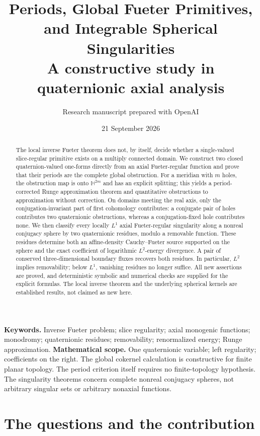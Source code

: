 \documentclass[11pt,a4paper]{article}
\title{\vspace{-12mm}\textbf{Periods, Global Fueter Primitives,\\and Integrable Spherical Singularities}\\[6pt]
\large A constructive study in quaternionic axial analysis}
\author{Research manuscript prepared with OpenAI}
\date{21 September 2026}
\numberwithin{equation}{section}
\theoremstyle{definition}
\theoremstyle{remark}
\newcommand{\HH}{\mathbb H}
\begin{document}
\maketitle
\thispagestyle{empty}
\begin{abstract}
The local inverse Fueter theorem does not, by itself, decide whether a
single-valued slice-regular primitive exists on a multiply connected domain.
We construct two closed quaternion-valued one-forms directly from an axial
Fueter-regular function and prove that their periods are the complete global
obstruction. For a meridian with $m$ holes, the obstruction map is onto
$\HH^{2m}$ and has an explicit splitting; this yields a period-corrected Runge
approximation theorem and quantitative obstructions to approximation without
correction. On domains meeting the real axis, only the conjugation-invariant
part of first cohomology contributes: a conjugate pair of holes contributes
two quaternionic obstructions, whereas a conjugation-fixed hole contributes
none. We then classify every locally $L^1$ axial Fueter-regular singularity
along a nonreal conjugacy sphere by two quaternionic residues, modulo a
removable function. These residues determine both an affine-density
Cauchy--Fueter source supported on the sphere and the exact coefficient of
logarithmic $L^2$-energy divergence. A pair of conserved three-dimensional
boundary fluxes recovers both residues. In particular, $L^2$ implies removability;
below $L^1$, vanishing residues no longer suffice. All new assertions are
proved, and deterministic symbolic and numerical checks are supplied for the
explicit formulas. The local inverse theorem and the underlying spherical
kernels are established results, not claimed as new here.
\end{abstract}
\medskip
\noindent\textbf{Keywords.} Inverse Fueter problem; slice regularity;
axial monogenic functions; monodromy; quaternionic residues; removability;
renormalized energy; Runge approximation.
\medskip
\noindent\textbf{Mathematical scope.} One quaternionic variable; left regularity;
coefficients on the right. The global cokernel calculation is constructive for
finite planar topology. The period criterion itself requires no finite-topology
hypothesis. The singularity theorems concern complete nonreal conjugacy spheres,
not arbitrary singular sets or arbitrary nonaxial functions.
\newpage
\begingroup\small
\setlength{\parskip}{0pt}
\makeatletter\patchcmd{\l@section}{1.0em}{0.45em}{}{}\makeatother
\tableofcontents
\endgroup
\newpage

\section{The questions and the contribution}
\label{sec:intro}
\end{document}
